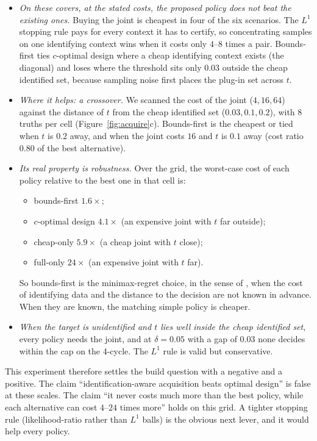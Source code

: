 \documentclass[11pt]{article}
\theoremstyle{definition}
\theoremstyle{remark}
\begin{document}
\begin{itemize}
  \item \emph{On these covers, at the stated costs, the proposed policy does not beat the existing ones.} Buying the joint is cheapest in four of the six scenarios. The $L^1$ stopping rule pays for every context it has to certify, so concentrating samples on one identifying context wins when it costs only $4$--$8$ times a pair. Bounds-first ties $c$-optimal design where a cheap identifying context exists (the diagonal) and loses where the threshold sits only $0.03$ outside the cheap identified set, because sampling noise first places the plug-in set across $t$.
  \item \emph{Where it helps: a crossover.} We scanned the cost of the joint ($4,16,64$) against the distance of $t$ from the cheap identified set ($0.03,0.1,0.2$), with $8$ truths per cell (Figure~\ref{fig:acquire}c). Bounds-first is the cheapest or tied when $t$ is $0.2$ away, and when the joint costs $16$ and $t$ is $0.1$ away (cost ratio $0.80$ of the best alternative).
  \item \emph{Its real property is robustness.} Over the grid, the worst-case cost of each policy relative to the best one in that cell is:
  \begin{itemize}
    \item bounds-first $1.6\times$;
    \item $c$-optimal design $4.1\times$ (an expensive joint with $t$ far outside);
    \item cheap-only $5.9\times$ (a cheap joint with $t$ close);
    \item full-only $24\times$ (an expensive joint with $t$ far).
  \end{itemize}
  So bounds-first is the minimax-regret choice, in the sense of \cite{dominitzmanski17}, when the cost of identifying data and the distance to the decision are not known in advance. When they are known, the matching simple policy is cheaper.
  \item \emph{When the target is unidentified and $t$ lies well inside the cheap identified set}, every policy needs the joint, and at $\delta=0.05$ with a gap of $0.03$ none decides within the cap on the 4-cycle. The $L^1$ rule is valid but conservative.
\end{itemize}
This experiment therefore settles the build question with a negative and a positive. The claim ``identification-aware acquisition beats optimal design'' is false at these scales. The claim ``it never costs much more than the best policy, while each alternative can cost $4$--$24$ times more'' holds on this grid. A tighter stopping rule (likelihood-ratio rather than $L^1$ balls) is the obvious next lever, and it would help every policy.
\end{document}
